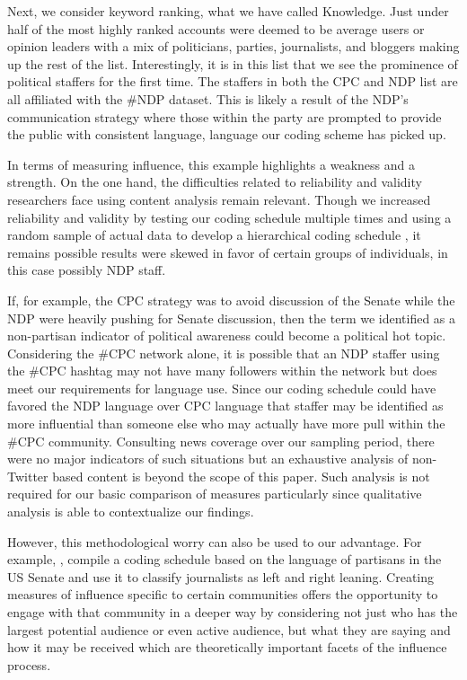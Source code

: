 \documentclass[a4paper,12pt]{article}
\begin{document}
Next, we consider keyword ranking, what we have called Knowledge. Just under half of the most highly ranked accounts were deemed to be average users or opinion leaders with a mix of politicians, parties, journalists, and bloggers making up the rest of the list. Interestingly, it is in this list that we see the prominence of political staffers for the first time. The staffers in both the CPC and NDP list are all affiliated with the \#NDP dataset. This is likely a result of the NDP's communication strategy where those within the party are prompted to provide the public with consistent language, language our coding scheme has picked up.

In terms of measuring influence, this example highlights a weakness and a strength. On the one hand, the difficulties related to reliability and validity researchers face using content analysis remain relevant. Though we increased reliability and validity by testing our coding schedule multiple times \cite{rourkeanderson} and using a random sample of actual data to develop a hierarchical coding schedule \cite{richardsrichards}, it remains possible results were skewed in favor of certain groups of individuals, in this case possibly NDP staff. 

If, for example, the CPC strategy was to avoid discussion of the Senate while the NDP were heavily pushing for Senate discussion, then the term we identified as a non-partisan indicator of political awareness could become a political hot topic. Considering the \#CPC network alone, it is possible that an NDP staffer using the \#CPC hashtag may not have many followers within the network but does meet our requirements for language use. Since our coding schedule could have favored the NDP language over CPC language that staffer may be identified as more influential than someone else who may actually have more pull within the \#CPC community. Consulting news coverage over our sampling period, there were no major indicators of such situations but an exhaustive analysis of non-Twitter based content is beyond the scope of this paper. Such analysis is not required for our basic comparison of measures particularly since qualitative analysis is able to contextualize our findings.

However, this methodological worry can also be used to our advantage. For example, \cite{Gentzkow2010}, compile a coding schedule based on the language of partisans in the US Senate and use it to classify journalists as left and right leaning. Creating measures of influence specific to certain communities offers the opportunity to engage with that community in a deeper way by considering not just who has the largest potential audience or even active audience, but what they are saying and how it may be received which are theoretically important facets of the influence process.
\end{document}
